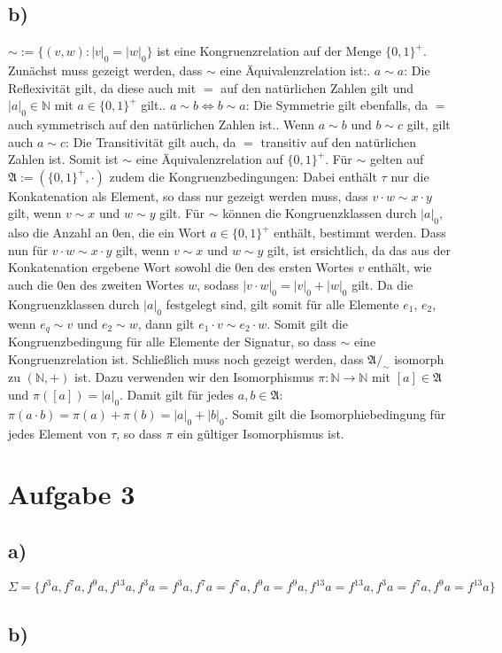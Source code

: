 \documentclass[11pt, a4paper]{article}
\begin{document}
\subsection*{b)}
$\sim := \{(v,w) : |v|_0 = |w|_0\}$ ist eine Kongruenzrelation auf der Menge $\{0,1\}^+$.\newline
Zunächst muss gezeigt werden, dass $\sim$ eine Äquivalenzrelation ist:. $a \sim a$: Die Reflexivität gilt, da diese auch mit $=$ auf den natürlichen Zahlen gilt und $|a|_0 \in \mathbb{N}$ mit $a \in \{0,1\}^+$ gilt.. $a \sim b \iff b \sim a$: Die Symmetrie gilt ebenfalls, da $=$ auch symmetrisch auf den natürlichen Zahlen ist.. Wenn $a \sim b$ und $b \sim c$ gilt, gilt auch $a \sim c$: Die Transitivität gilt auch, da $=$ transitiv auf den natürlichen Zahlen ist.\newline
Somit ist $\sim$ eine Äquivalenzrelation auf $\{0,1\}^+$.\newline
Für $\sim$ gelten auf $\mathfrak{A}:=(\{0,1\}^+, \cdot)$ zudem die Kongruenzbedingungen:\newline
Dabei enthält $\tau$ nur die Konkatenation als Element, so dass nur gezeigt werden muss, dass $v\cdot w \sim x \cdot y$ gilt, wenn $v\sim x$ und $w\sim y$ gilt.\newline
Für $\sim$ können die Kongruenzklassen durch $|a|_0$, also die Anzahl an 0en, die ein Wort $a\in \{0,1\}^+$ enthält, bestimmt werden. Dass nun für $v \cdot w \sim x \cdot y$ gilt, wenn $v \sim x$ und $w \sim y$ gilt, ist ersichtlich, da das aus der Konkatenation ergebene Wort sowohl die 0en des ersten Wortes $v$ enthält, wie auch die 0en des zweiten Wortes $w$, sodass $|v \cdot w|_0 = |v|_0 + |w|_0$ gilt. Da die Kongruenzklassen durch $|a|_0$ festgelegt sind, gilt somit für alle Elemente $e_1$, $e_2$, wenn $e_q \sim v$ und $e_2 \sim w$, dann gilt $e_1 \cdot v \sim e_2 \cdot w$.\newline
Somit gilt die Kongruenzbedingung für alle Elemente der Signatur, so dass $\sim$ eine Kongruenzrelation ist.\newline
Schließlich muss noch gezeigt werden, dass $\mathfrak{A}/_\sim$ isomorph zu $(\mathbb{N}, +)$ ist. Dazu verwenden wir den Isomorphismus $\pi: \mathbb{N} \rightarrow \mathbb{N}$ mit $[a]\in \mathfrak{A}$ und $\pi([a]) = |a|_0$. Damit gilt für jedes $a,b\in \mathfrak{A}$: $\pi(a \cdot b) = \pi(a) + \pi(b) = |a|_0 + |b|_0$.\newline
Somit gilt die Isomorphiebedingung für jedes Element von $\tau$, so dass $\pi$ ein gültiger Isomorphismus ist.


\section*{Aufgabe 3}
\subsection*{a)}
$\Sigma = \{f^3a, f^7a, f^9a, f^{13}a, f^3 a = f^3 a, f^7 a = f^7 a, f^9 a = f^9 a, f^{13} a = f^{13} a, f^3 a = f^7 a, f^9 a = f^{13} a\}$
\subsection*{b)}
\end{document}
